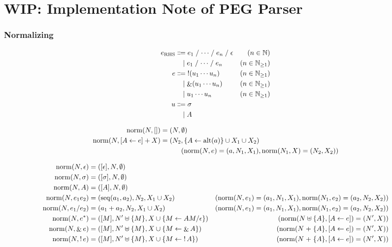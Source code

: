 \section{WIP: Implementation Note of PEG Parser}

\subsubsection{Normalizing}

\begin{align*}
  e_{\mathrm{RHS}}
  &\Coloneqq e_1 \mathrel{/} \cdots \mathrel{/} e_n \mathrel{/} \epsilon &(n \in \Natural) \\
  &\BNFor e_1 \mathrel{/} \cdots \mathrel{/} e_n &(n \in \Natural_{\geq 1}) \\
  e
  &\Coloneqq \mathop{!} (u_1 \cdots u_n) &(n \in \Natural_{\geq 1}) \\
  &\BNFor \mathop{\&} (u_1 \cdots u_n) &(n \in \Natural_{\geq 1}) \\
  &\BNFor u_1 \cdots u_n &(n \in \Natural_{\geq 1}) \\
  u
  &\Coloneqq \sigma \\
  &\BNFor A
\end{align*}

\begin{align*}
  \mathop{\mathrm{norm}}(N, []) &= (N, \emptyset) \\
  \mathop{\mathrm{norm}}(N, [A \gets e] + X) &= (N_2, \{A \gets \mathop{\mathrm{alt}}(a)\} \cup X_1 \cup X_2) \\
  &\hspace{3em}(\mathop{\mathrm{norm}}(N, e) = (a, N_1, X_1), \mathop{\mathrm{norm}}(N_1, X) = (N_2, X_2))
\end{align*}

\begin{align*}
  \mathop{\mathrm{norm}}(N, \epsilon) &= ([\epsilon], N, \emptyset) \\
  \mathop{\mathrm{norm}}(N, \sigma) &= ([\sigma], N, \emptyset) \\
  \mathop{\mathrm{norm}}(N, A) &= ([A], N, \emptyset) \\
  \mathop{\mathrm{norm}}(N, e_1 e_2) &= (\mathop{\mathrm{seq}}(a_1, a_2), N_2, X_1 \cup X_2) &(\mathop{\mathrm{norm}}(N, e_1) = (a_1, N_1, X_1), \mathop{\mathrm{norm}}(N_1, e_2) = (a_2, N_2, X_2)) \\
  \mathop{\mathrm{norm}}(N, e_1 / e_2) &= (a_1 + a_2, N_2, X_1 \cup X_2) &(\mathop{\mathrm{norm}}(N, e_1) = (a_1, N_1, X_1), \mathop{\mathrm{norm}}(N_1, e_2) = (a_2, N_2, X_2)) \\
  \mathop{\mathrm{norm}}(N, e^*) &= ([M], N' \uplus \{M\}, X \cup \{M \gets A M / \epsilon\}) &(\mathop{\mathrm{norm}}(N \uplus \{A\}, [A \gets e]) = (N', X)) \\
  \mathop{\mathrm{norm}}(N, \mathop{\&} e) &= ([M], N' \uplus \{M\}, X \cup \{M \gets \mathop{\&} A\}) &(\mathop{\mathrm{norm}}(N \mathrel{+} \{A\}, [A \gets e]) = (N', X)) \\
  \mathop{\mathrm{norm}}(N, \mathop{!} e) &= ([M], N' \uplus \{M\}, X \cup \{M \gets \mathop{!} A\}) &(\mathop{\mathrm{norm}}(N \mathrel{+} \{A\}, [A \gets e]) = (N', X))
\end{align*}

